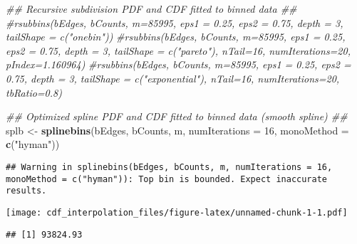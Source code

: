 \documentclass[]{article}
\newenvironment{Shaded}{\begin{snugshade}}{\end{snugshade}}
\newcommand{\CommentTok}[1]{\textcolor[rgb]{0.56,0.35,0.01}{\textit{#1}}}
\newcommand{\ControlFlowTok}[1]{\textcolor[rgb]{0.13,0.29,0.53}{\textbf{#1}}}
\newcommand{\DataTypeTok}[1]{\textcolor[rgb]{0.13,0.29,0.53}{#1}}
\newcommand{\DecValTok}[1]{\textcolor[rgb]{0.00,0.00,0.81}{#1}}
\newcommand{\KeywordTok}[1]{\textcolor[rgb]{0.13,0.29,0.53}{\textbf{#1}}}
\newcommand{\NormalTok}[1]{#1}
\newcommand{\OperatorTok}[1]{\textcolor[rgb]{0.81,0.36,0.00}{\textbf{#1}}}
\newcommand{\StringTok}[1]{\textcolor[rgb]{0.31,0.60,0.02}{#1}}
\begin{document}
\begin{Shaded}
\begin{Highlighting}[]
\CommentTok{## Recursive subdivision PDF and CDF fitted to binned data ##}
\CommentTok{#rsubbins(bEdges, bCounts, m=85995, eps1 = 0.25, eps2 = 0.75, depth = 3, tailShape = c("onebin"))}
\CommentTok{#rsubbins(bEdges, bCounts, m=85995, eps1 = 0.25, eps2 = 0.75, depth = 3, tailShape = c("pareto"), nTail=16, numIterations=20, pIndex=1.160964)}
\CommentTok{#rsubbins(bEdges, bCounts, m=85995, eps1 = 0.25, eps2 = 0.75, depth = 3, tailShape = c("exponential"), nTail=16, numIterations=20, tbRatio=0.8)}

\CommentTok{## Optimized spline PDF and CDF fitted to binned data (smooth spline) ##}
\NormalTok{splb <-}\StringTok{ }\KeywordTok{splinebins}\NormalTok{(bEdges, bCounts, m, }\DataTypeTok{numIterations =} \DecValTok{16}\NormalTok{, }\DataTypeTok{monoMethod =} \KeywordTok{c}\NormalTok{(}\StringTok{"hyman"}\NormalTok{)) }
\end{Highlighting}
\end{Shaded}

\begin{verbatim}
## Warning in splinebins(bEdges, bCounts, m, numIterations = 16, monoMethod = c("hyman")): Top bin is bounded. Expect inaccurate results.
\end{verbatim}

\begin{Shaded}
\end{Shaded}

\texttt{[image: cdf\_interpolation\_files/figure-latex/unnamed-chunk-1-1.pdf]}

\begin{Shaded}
\end{Shaded}

\begin{verbatim}
## [1] 93824.93
\end{verbatim}
\end{document}

